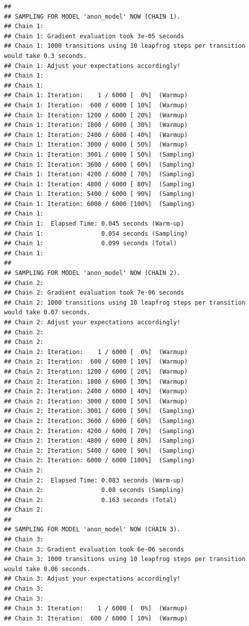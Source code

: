 \documentclass[
]{article}
\begin{document}
\begin{verbatim}
## 
## SAMPLING FOR MODEL 'anon_model' NOW (CHAIN 1).
## Chain 1: 
## Chain 1: Gradient evaluation took 3e-05 seconds
## Chain 1: 1000 transitions using 10 leapfrog steps per transition would take 0.3 seconds.
## Chain 1: Adjust your expectations accordingly!
## Chain 1: 
## Chain 1: 
## Chain 1: Iteration:    1 / 6000 [  0%]  (Warmup)
## Chain 1: Iteration:  600 / 6000 [ 10%]  (Warmup)
## Chain 1: Iteration: 1200 / 6000 [ 20%]  (Warmup)
## Chain 1: Iteration: 1800 / 6000 [ 30%]  (Warmup)
## Chain 1: Iteration: 2400 / 6000 [ 40%]  (Warmup)
## Chain 1: Iteration: 3000 / 6000 [ 50%]  (Warmup)
## Chain 1: Iteration: 3001 / 6000 [ 50%]  (Sampling)
## Chain 1: Iteration: 3600 / 6000 [ 60%]  (Sampling)
## Chain 1: Iteration: 4200 / 6000 [ 70%]  (Sampling)
## Chain 1: Iteration: 4800 / 6000 [ 80%]  (Sampling)
## Chain 1: Iteration: 5400 / 6000 [ 90%]  (Sampling)
## Chain 1: Iteration: 6000 / 6000 [100%]  (Sampling)
## Chain 1: 
## Chain 1:  Elapsed Time: 0.045 seconds (Warm-up)
## Chain 1:                0.054 seconds (Sampling)
## Chain 1:                0.099 seconds (Total)
## Chain 1: 
## 
## SAMPLING FOR MODEL 'anon_model' NOW (CHAIN 2).
## Chain 2: 
## Chain 2: Gradient evaluation took 7e-06 seconds
## Chain 2: 1000 transitions using 10 leapfrog steps per transition would take 0.07 seconds.
## Chain 2: Adjust your expectations accordingly!
## Chain 2: 
## Chain 2: 
## Chain 2: Iteration:    1 / 6000 [  0%]  (Warmup)
## Chain 2: Iteration:  600 / 6000 [ 10%]  (Warmup)
## Chain 2: Iteration: 1200 / 6000 [ 20%]  (Warmup)
## Chain 2: Iteration: 1800 / 6000 [ 30%]  (Warmup)
## Chain 2: Iteration: 2400 / 6000 [ 40%]  (Warmup)
## Chain 2: Iteration: 3000 / 6000 [ 50%]  (Warmup)
## Chain 2: Iteration: 3001 / 6000 [ 50%]  (Sampling)
## Chain 2: Iteration: 3600 / 6000 [ 60%]  (Sampling)
## Chain 2: Iteration: 4200 / 6000 [ 70%]  (Sampling)
## Chain 2: Iteration: 4800 / 6000 [ 80%]  (Sampling)
## Chain 2: Iteration: 5400 / 6000 [ 90%]  (Sampling)
## Chain 2: Iteration: 6000 / 6000 [100%]  (Sampling)
## Chain 2: 
## Chain 2:  Elapsed Time: 0.083 seconds (Warm-up)
## Chain 2:                0.08 seconds (Sampling)
## Chain 2:                0.163 seconds (Total)
## Chain 2: 
## 
## SAMPLING FOR MODEL 'anon_model' NOW (CHAIN 3).
## Chain 3: 
## Chain 3: Gradient evaluation took 6e-06 seconds
## Chain 3: 1000 transitions using 10 leapfrog steps per transition would take 0.06 seconds.
## Chain 3: Adjust your expectations accordingly!
## Chain 3: 
## Chain 3: 
## Chain 3: Iteration:    1 / 6000 [  0%]  (Warmup)
## Chain 3: Iteration:  600 / 6000 [ 10%]  (Warmup)

\end{verbatim}
\end{document}
